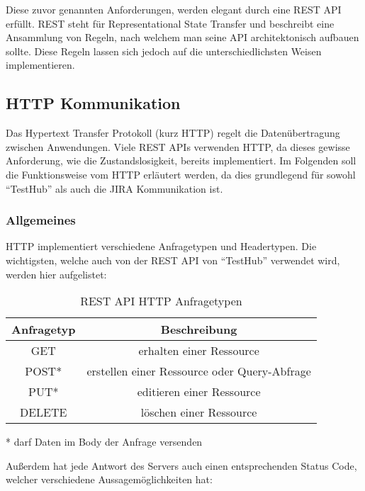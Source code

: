 Diese zuvor genannten Anforderungen, werden elegant durch eine \gls{REST} \gls{API}
erfüllt. REST steht für Representational State Transfer und beschreibt eine Ansammlung von
Regeln, nach welchem man seine \gls{API} architektonisch aufbauen sollte. Diese 
Regeln lassen sich jedoch auf die unterschiedlichsten Weisen implementieren. 

\subsection{HTTP Kommunikation}
Das Hypertext Transfer Protokoll (kurz HTTP) regelt die Datenübertragung zwischen
Anwendungen. Viele \gls{REST} \gls{API}s verwenden HTTP, da dieses gewisse
Anforderung, wie die Zustandslosigkeit, bereits implementiert. Im Folgenden soll
die Funktionsweise vom HTTP erläutert werden, da dies grundlegend für sowohl ``TestHub''
als auch die \gls{JIRA} Kommunikation ist.

\subsubsection{Allgemeines}
HTTP implementiert verschiedene Anfragetypen und Headertypen. Die wichtigsten,
welche auch von der \gls{REST} \gls{API} von ``TestHub'' verwendet wird, werden 
hier aufgelistet:

\begin{table}[h!]
    \centering
    \begin{tabular}{|c | c|} 
     \hline
     \textbf{Anfragetyp} & \textbf{Beschreibung} \\ [1ex] 
     \hline
     GET & erhalten einer Ressource \\ [1ex]
     \hline
     POST* & erstellen einer Ressource oder Query-Abfrage \\ [1ex] 
     \hline
     PUT* & editieren einer Ressource \\ [1ex] 
     \hline
     DELETE & löschen einer Ressource \\ [1ex] 
     \hline
    \end{tabular}
    \caption{REST API HTTP Anfragetypen}
    * darf Daten im Body der Anfrage versenden
    \label{table:requests}
\end{table}

Außerdem hat jede Antwort des Servers auch einen entsprechenden Status Code, 
welcher verschiedene Aussagemöglichkeiten hat:

